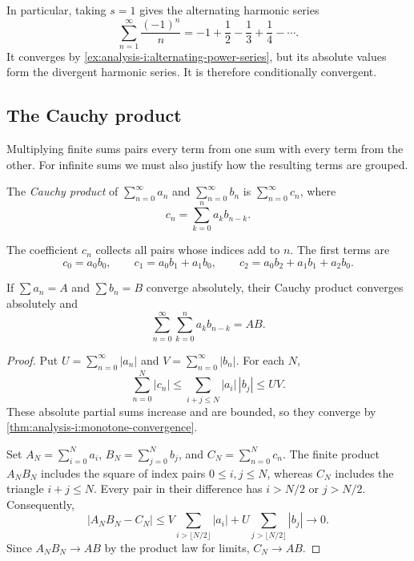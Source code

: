 In particular, taking $s=1$ gives the alternating harmonic series
\[
  \sum_{n=1}^{\infty}\frac{(-1)^n}{n}
  =-1+\frac12-\frac13+\frac14-\cdots.
\]
It converges by \autoref{ex:analysis-i:alternating-power-series}, but
its absolute values form the divergent harmonic series. It is therefore
conditionally convergent.

\subsection{The Cauchy product}

Multiplying finite sums pairs every term from one sum with every term
from the other. For infinite sums we must also justify how the resulting
terms are grouped.

\begin{definition}
  \label{thm:analysis-i:cauchy-product}
  The \emph{Cauchy product} of $\sum_{n=0}^{\infty}a_n$ and
  $\sum_{n=0}^{\infty}b_n$ is $\sum_{n=0}^{\infty}c_n$, where
  \[
    c_n=\sum_{k=0}^{n}a_kb_{n-k}.
  \]
\end{definition}
The coefficient $c_n$ collects all pairs whose indices add to $n$.
The first terms are
\[
  c_0=a_0b_0,\qquad c_1=a_0b_1+a_1b_0,\qquad
  c_2=a_0b_2+a_1b_1+a_2b_0.
\]

\begin{theorem}
  \label{thm:analysis-i:absolute-cauchy-product}
  If $\sum a_n=A$ and $\sum b_n=B$ converge absolutely, their Cauchy
  product converges absolutely and
  \[
    \sum_{n=0}^{\infty}\sum_{k=0}^{n}a_kb_{n-k}=AB.
  \]
\end{theorem}
\begin{proof}
  Put $U=\sum_{n=0}^{\infty}|a_n|$ and
  $V=\sum_{n=0}^{\infty}|b_n|$. For each $N$,
  \[
    \sum_{n=0}^{N}|c_n|
      \le\sum_{i+j\le N}|a_i|\,|b_j|\le UV.
  \]
  These absolute partial sums increase and are bounded, so they
  converge by \autoref{thm:analysis-i:monotone-convergence}.

  Set $A_N=\sum_{i=0}^{N}a_i$, $B_N=\sum_{j=0}^{N}b_j$, and
  $C_N=\sum_{n=0}^{N}c_n$. The finite product $A_NB_N$ includes the
  square of index pairs $0\le i,j\le N$, whereas $C_N$ includes the
  triangle $i+j\le N$. Every pair in their difference has
  $i>N/2$ or $j>N/2$. Consequently,
  \[
    |A_NB_N-C_N|
      \le V\sum_{i>\lfloor N/2\rfloor}|a_i|
        +U\sum_{j>\lfloor N/2\rfloor}|b_j|
      \longrightarrow0.
  \]
  Since $A_NB_N\to AB$ by the product law for limits, $C_N\to AB$.
\end{proof}

